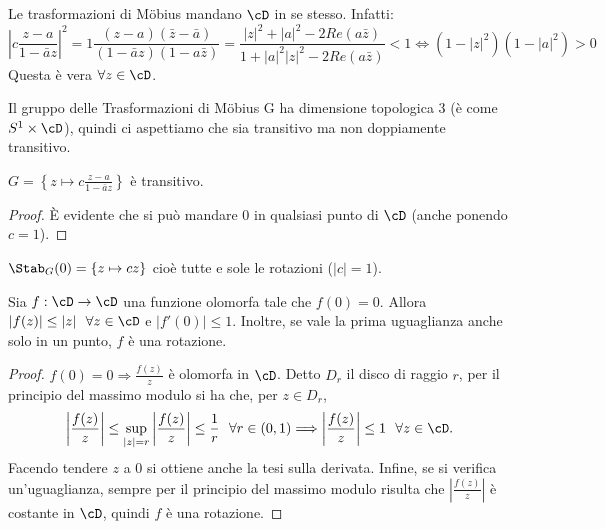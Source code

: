 \begin{osservazione}
	Le trasformazioni di Möbius mandano $\cD$ in se stesso. Infatti:
$$\left|c \frac{z-a}{1- \bar{a}z} \right|^2 = 1 \frac{(z-a)(\bar{z}-\bar{a})}{(1- \bar{a}z)({1- a\bar{z}})}=
\frac{|z|^2 + |a|^2 - 2Re(a \bar{z})}{1+ |a|^2 |z|^2 - 2Re(a \bar{z})} <1
\Longleftrightarrow \left( 1-|z|^2 \right) \left( 1-|a|^2 \right) >0$$
	Questa è vera $\forall z \in \cD$.
\end{osservazione}

\begin{osservazione}
	Il gruppo delle Trasformazioni di Möbius G ha dimensione topologica 3 (è come $S^1 \times \cD$),
quindi ci aspettiamo che sia transitivo ma non doppiamente transitivo.
\end{osservazione}

\begin{lemma}
$G= \left \{ z \mapsto \displaystyle{c \frac{z-a}{1- \bar{a}z}} \right \}$ è transitivo.
\end{lemma}
\begin{proof}
	È evidente che si può mandare $0$ in qualsiasi punto di $\cD$ (anche ponendo $c=1$).
\end{proof}

\begin{osservazione}
$\Stab_G (0) = \{z \mapsto cz \}$ cioè tutte e sole le rotazioni ($|c| = 1$).
\end{osservazione}

\begin{lemma}[di Schwarz]
	Sia $f: \cD \rightarrow \cD$ una funzione olomorfa tale che $f(0)=0$.
	Allora $|f(z)| \leq |z|\ \ \forall z \in \cD$ e $|f'(0)| \leq 1$. Inoltre, se vale la prima uguaglianza anche solo in un punto, $f$ è una rotazione.
\end{lemma}
\begin{proof}
	$f(0)=0 \Rightarrow \frac{f(z)}{z}$ è olomorfa in $\cD$. Detto $D_r$ il disco di raggio $r$,
per il principio del massimo modulo si ha che, per $z \in D_r$,
	\[
		\left| \frac{f(z)}{z} \right| \leq \sup_{|z|=r} \left| \frac{f(z)}{z} \right| \leq \frac{1}{r} \ \  \forall r \in (0,1)
	\Longrightarrow \left| \frac{f(z)}{z} \right| \leq 1 \ \ \forall z \in \cD.
	\]
Facendo tendere $z$ a $0$ si ottiene anche la tesi sulla derivata.
Infine, se si verifica un'uguaglianza, sempre per il principio del massimo modulo risulta che
	$\left| \frac{f(z)}{z} \right|$ è costante in $\cD$, quindi $f$ è una rotazione.
\end{proof}

